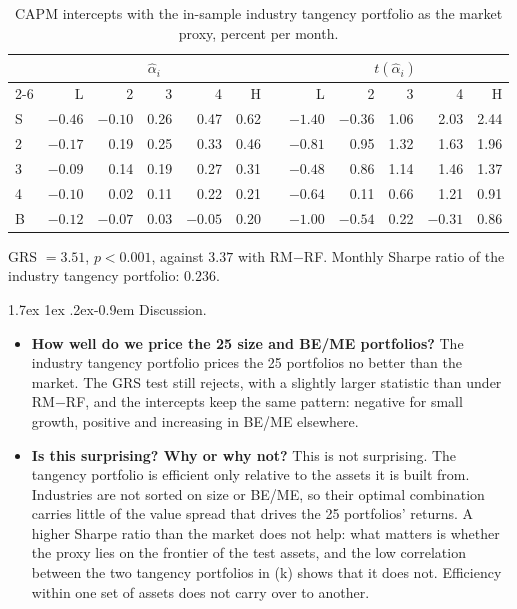 \documentclass[11pt]{article}
\makeatletter
\renewcommand\paragraph{\@startsection{paragraph}{4}{0pt}%
  {1.7ex \@plus 1ex \@minus .2ex}{-0.9em}%
  {\normalfont\bfseries\normalsize\color{psink}}}
\makeatother
\begin{document}
\begin{table}[H]
\centering
\caption{CAPM intercepts with the in-sample industry tangency portfolio as
the market proxy, percent per month.}
\small
\begin{tabular}{lrrrrrcrrrrr}
\toprule
& \multicolumn{5}{c}{$\hat\alpha_i$} && \multicolumn{5}{c}{$t(\hat\alpha_i)$} \\
\cmidrule{2-6}\cmidrule{8-12}
& L & 2 & 3 & 4 & H && L & 2 & 3 & 4 & H \\
\midrule
S & $-0.46$ & $-0.10$ & 0.26 & 0.47 & 0.62 && $-1.40$ & $-0.36$ & 1.06 & 2.03 & 2.44 \\
2 & $-0.17$ & 0.19 & 0.25 & 0.33 & 0.46 && $-0.81$ & 0.95 & 1.32 & 1.63 & 1.96 \\
3 & $-0.09$ & 0.14 & 0.19 & 0.27 & 0.31 && $-0.48$ & 0.86 & 1.14 & 1.46 & 1.37 \\
4 & $-0.10$ & 0.02 & 0.11 & 0.22 & 0.21 && $-0.64$ & 0.11 & 0.66 & 1.21 & 0.91 \\
B & $-0.12$ & $-0.07$ & 0.03 & $-0.05$ & 0.20 && $-1.00$ & $-0.54$ & 0.22 & $-0.31$ & 0.86 \\
\bottomrule
\end{tabular}
\label{tab:p3i}
\vspace{2pt}\begin{minipage}{0.93\textwidth}\footnotesize
GRS $= 3.51$, $p < 0.001$, against $3.37$ with RM$-$RF. Monthly Sharpe
ratio of the industry tangency portfolio: $0.236$.
\end{minipage}
\end{table}

\paragraph{Discussion.}
\begin{itemize}
\setlength{\itemsep}{4pt}\setlength{\parskip}{0pt}

\item \textbf{How well do we price the 25 size and BE/ME portfolios?}
The industry tangency portfolio prices the 25 portfolios no better than the
market. The GRS test still rejects, with a slightly larger
statistic than under RM$-$RF, and the intercepts keep the same pattern:
negative for small growth, positive and increasing in BE/ME elsewhere.

\item \textbf{Is this surprising? Why or why not?} This is not
surprising. The tangency portfolio is efficient
only relative to the assets it is built from. Industries are not sorted on
size or BE/ME, so their optimal combination carries little of the value
spread that drives the 25 portfolios' returns. A higher Sharpe ratio than
the market does not help: what matters is whether the proxy lies on the
frontier of the test assets, and the low correlation between the two tangency portfolios in (k) shows that it does not. Efficiency within one set of assets does not carry over to another.

\end{itemize}
\end{document}
